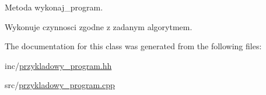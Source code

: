 Metoda wykonaj\+\_\+program. 

Wykonuje czynnosci zgodne z zadanym algorytmem. 

The documentation for this class was generated from the following files\+:\begin{DoxyCompactItemize}
\item 
inc/\hyperlink{przykladowy__program_8hh}{przykladowy\+\_\+program.\+hh}\item 
src/\hyperlink{przykladowy__program_8cpp}{przykladowy\+\_\+program.\+cpp}\end{DoxyCompactItemize}
